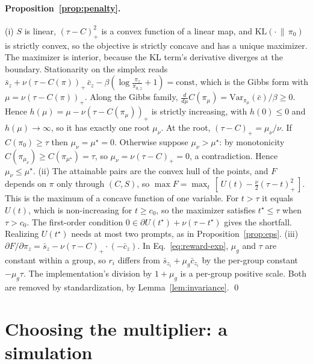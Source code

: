 \paragraph{Proposition~\ref{prop:penalty}.}
(i) $S$ is linear, $(\tau - C)_+^2$ is a convex function of a linear map, and
$\mathrm{KL}(\cdot\,\|\,\pi_0)$ is strictly convex, so the objective is
strictly concave and has a unique maximizer. The maximizer is interior,
because the KL term's derivative diverges at the boundary. Stationarity on the
simplex reads
$\bar s_z + \nu(\tau - C(\pi))_+\,\bar c_z - \beta(\log\frac{\pi_z}{\pi_{0,z}} + 1) =
\text{const}$, which is the Gibbs form with $\mu = \nu(\tau - C(\pi))_+$.
Along the Gibbs family, $\frac{d}{d\mu}C(\pi_\mu) =
\mathrm{Var}_{\pi_\mu}(\bar c)/\beta \ge 0$. Hence
$h(\mu) = \mu - \nu(\tau - C(\pi_\mu))_+$ is strictly increasing, with
$h(0) \le 0$ and $h(\mu) \to \infty$, so it has exactly one root $\mu_\nu$. At
the root, $(\tau - C)_+ = \mu_\nu/\nu$. If $C(\pi_0) \ge \tau$ then
$\mu_\nu = \mu^\star = 0$. Otherwise suppose $\mu_\nu > \mu^\star$: by
monotonicity $C(\pi_{\mu_\nu}) \ge C(\pi_{\mu^\star}) = \tau$, so
$\mu_\nu = \nu(\tau - C)_+ = 0$, a contradiction. Hence $\mu_\nu \le \mu^\star$.
(ii) The attainable pairs are the convex hull of the points, and $F$ depends
on $\pi$ only through $(C,S)$, so $\max F = \max_t\,[\,U(t) - \frac{\nu}{2}(\tau
- t)_+^2\,]$. This is the maximum of a concave function of one variable. For
$t > \tau$ it equals $U(t)$, which is non-increasing for $t \ge c_0$, so the
maximizer satisfies $t^\star \le \tau$ when $\tau > c_0$. The first-order
condition $0 \in \partial U(t^\star) + \nu(\tau - t^\star)$ gives the
shortfall. Realizing $U(t^\star)$ needs at most two prompts, as in
Proposition~\ref{prop:eps}.
(iii) $\partial F/\partial\pi_z = \bar s_z - \nu(\tau - C)_+\cdot(-\bar c_z)$. In
Eq.~\eqref{eq:reward-exp}, $\mu_g$ and $\tau$ are constant within a group, so
$r_i$ differs from $\bar s_{z_i} + \mu_g\bar c_{z_i}$ by the per-group constant
$-\mu_g\tau$. The implementation's division by $1 + \mu_g$ is a per-group
positive scale. Both are removed by standardization, by
Lemma~\ref{lem:invariance}. \qed

\section{Choosing the multiplier: a simulation}
\label{app:sim}

